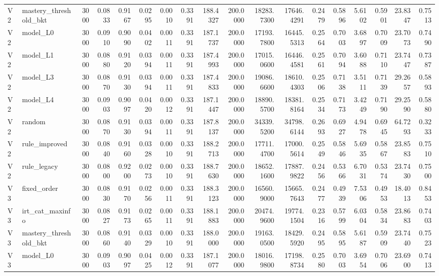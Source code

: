 \begin{table}
\begin{tabular}{llrrrrrrrrrrrrrrrr}
V2 & mastery\_threshold\_bkt & 3000 & 0.0833 & 0.9167 & 0.0295 & 0.0010 & 0.3391 & 188.4327 & 200.0000 & 18283.7300 & 17646.4291 & 0.2479 & 0.5896 & 5.6102 & 0.5901 & 23.8347 & 0.7513 \\
V2 & model\_L0 & 3000 & 0.0910 & 0.9090 & 0.0402 & 0.0011 & 0.3391 & 187.1737 & 200.0000 & 17193.7800 & 16445.5313 & 0.2564 & 0.7003 & 3.6897 & 0.7009 & 23.7073 & 0.7490 \\
V2 & model\_L1 & 3000 & 0.0880 & 0.9120 & 0.0394 & 0.0011 & 0.3391 & 187.4993 & 200.0000 & 17015.0600 & 16446.4581 & 0.2561 & 0.7094 & 3.6088 & 0.7110 & 23.7447 & 0.7387 \\
V2 & model\_L3 & 3000 & 0.0870 & 0.9130 & 0.0394 & 0.0011 & 0.3391 & 187.4833 & 200.0000 & 19086.6600 & 18610.4303 & 0.2506 & 0.7138 & 3.5111 & 0.7139 & 29.2657 & 0.5893 \\
V2 & model\_L4 & 3000 & 0.0903 & 0.9097 & 0.0420 & 0.0012 & 0.3391 & 187.1447 & 200.0000 & 18890.5700 & 18381.8164 & 0.2534 & 0.7173 & 3.4249 & 0.7190 & 29.2590 & 0.5880 \\
V2 & random & 3000 & 0.0870 & 0.9130 & 0.0394 & 0.0011 & 0.3391 & 187.8137 & 200.0000 & 34339.5200 & 34798.6144 & 0.2693 & 0.6927 & 4.9478 & 0.6945 & 64.7293 & 0.3233 \\
V2 & rule\_improved & 3000 & 0.0840 & 0.9160 & 0.0328 & 0.0010 & 0.3391 & 188.2713 & 200.0000 & 17711.4700 & 17000.5614 & 0.2549 & 0.5846 & 5.6935 & 0.5867 & 23.8583 & 0.7510 \\
V2 & rule\_legacy & 3000 & 0.0800 & 0.9200 & 0.0273 & 0.0010 & 0.3391 & 188.7630 & 200.0000 & 18652.1600 & 17887.9822 & 0.2456 & 0.5366 & 6.7031 & 0.5374 & 23.7430 & 0.7500 \\
V3 & fixed\_order & 3000 & 0.0830 & 0.9170 & 0.0256 & 0.0011 & 0.3391 & 188.3123 & 200.0000 & 16560.9000 & 15665.7643 & 0.2477 & 0.4939 & 7.5306 & 0.4953 & 18.4013 & 0.8453 \\
V3 & irt\_cat\_maxinfo & 3000 & 0.0827 & 0.9173 & 0.0265 & 0.0011 & 0.3391 & 188.1883 & 200.0000 & 20474.9600 & 19774.1504 & 0.2316 & 0.5799 & 6.0304 & 0.5834 & 23.8683 & 0.7403 \\
V3 & mastery\_threshold\_bkt & 3000 & 0.0860 & 0.9140 & 0.0329 & 0.0010 & 0.3391 & 188.0000 & 200.0000 & 19163.0500 & 18429.5920 & 0.2495 & 0.5895 & 5.6187 & 0.5909 & 23.7440 & 0.7523 \\
V3 & model\_L0 & 3000 & 0.0903 & 0.9097 & 0.0425 & 0.0012 & 0.3391 & 187.1077 & 200.0000 & 18016.9800 & 17198.8734 & 0.2580 & 0.7003 & 3.6954 & 0.7006 & 23.6900 & 0.7413 \\

\end{tabular}
\end{table}
